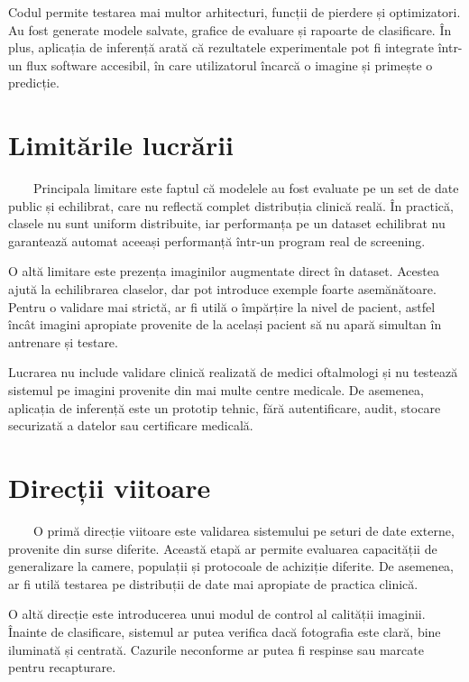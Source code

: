 \documentclass[12pt, a4paper, oneside, romanian]{teza-upb}
\begin{document}
Codul permite testarea mai multor arhitecturi, funcții de pierdere și optimizatori. Au fost generate modele salvate, grafice de evaluare și rapoarte de clasificare. În plus, aplicația de inferență arată că rezultatele experimentale pot fi integrate într-un flux software accesibil, în care utilizatorul încarcă o imagine și primește o predicție.

\section{Limitările lucrării}

\ \ \ \ Principala limitare este faptul că modelele au fost evaluate pe un set de date public și echilibrat, care nu reflectă complet distribuția clinică reală. În practică, clasele nu sunt uniform distribuite, iar performanța pe un dataset echilibrat nu garantează automat aceeași performanță într-un program real de screening.
\bigskip

O altă limitare este prezența imaginilor augmentate direct în dataset. Acestea ajută la echilibrarea claselor, dar pot introduce exemple foarte asemănătoare. Pentru o validare mai strictă, ar fi utilă o împărțire la nivel de pacient, astfel încât imagini apropiate provenite de la același pacient să nu apară simultan în antrenare și testare.
\bigskip

Lucrarea nu include validare clinică realizată de medici oftalmologi și nu testează sistemul pe imagini provenite din mai multe centre medicale. De asemenea, aplicația de inferență este un prototip tehnic, fără autentificare, audit, stocare securizată a datelor sau certificare medicală.

\section{Direcții viitoare}

\ \ \ \ O primă direcție viitoare este validarea sistemului pe seturi de date externe, provenite din surse diferite. Această etapă ar permite evaluarea capacității de generalizare la camere, populații și protocoale de achiziție diferite. De asemenea, ar fi utilă testarea pe distribuții de date mai apropiate de practica clinică.
\bigskip

O altă direcție este introducerea unui modul de control al calității imaginii. Înainte de clasificare, sistemul ar putea verifica dacă fotografia este clară, bine iluminată și centrată. Cazurile neconforme ar putea fi respinse sau marcate pentru recapturare.
\bigskip
\end{document}
